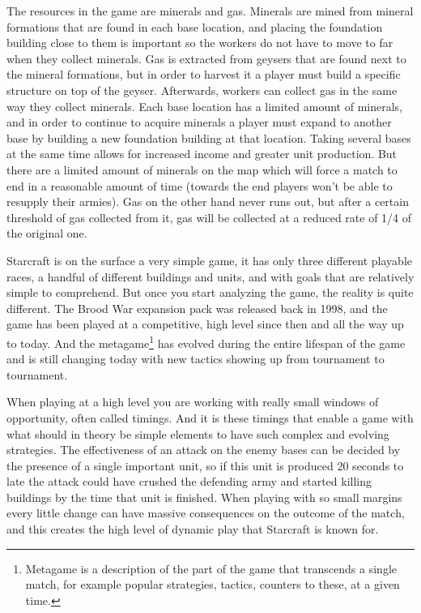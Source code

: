 The resources in the game are minerals and gas. Minerals are mined from mineral
formations that are found in each base location, and placing the foundation
building close to them is important so the workers do not have to move to far
when they collect minerals. Gas is extracted from geysers that are found next to
the mineral formations, but in order to harvest it a player must build a
specific structure on top of the geyser. Afterwards, workers can collect gas in
the same way they collect minerals. Each base location has a limited amount of
minerals, and in order to continue to acquire minerals a player must expand to
another base by building a new foundation building at that location. Taking
several bases at the same time allows for increased income and greater unit
production. But there are a limited amount of minerals on the map which will
force a match to end in a reasonable amount of time (towards the end players
won't be able to resupply their armies). Gas on the other hand never runs out,
but after a certain threshold of gas collected from it, gas will be collected at
a reduced rate of 1/4 of the original one.

Starcraft is on the surface a very simple game, it has only three different
playable races, a handful of different buildings and units, and with goals that
are relatively simple to comprehend. But once you start analyzing the game, the
reality is quite different. The Brood War expansion pack was released back in
1998, and the game has been played at a competitive, high level since then and
all the way up to today. And the metagame\footnote{Metagame is a description of
the part of the game that transcends a single match, for example popular
strategies, tactics, counters to these, at a given time.} has evolved during the
entire lifespan of the game and is still changing today with new tactics showing
up from tournament to tournament. \cite{starcraft}

When playing at a high level you are working with really small windows of
opportunity, often called timings. And it is these timings that enable a game
with what should in theory be simple elements to have such complex and evolving
strategies. The effectiveness of an attack on the enemy bases can be decided by
the presence of a single important unit, so if this unit is produced 20 seconds
to late the attack could have crushed the defending army and started killing
buildings by the time that unit is finished. When playing with so small margins
every little change can have massive consequences on the outcome of the match,
and this creates the high level of dynamic play that Starcraft is known for.
 
